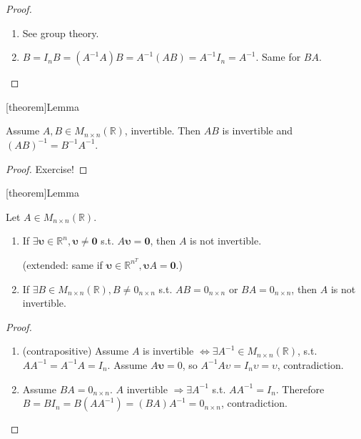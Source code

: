 \documentclass[12pt]{report}
\theoremstyle{definition}
\begin{document}
\begin{proof}
    \,

    \begin{enumerate}[label = (\arabic*)]
        \item See group theory.
        \item $B = I_n B = (A^{-1} A)B = A^{-1} (AB) = A^{-1} I_n = A^{-1}$.
            Same for $BA$.
    \end{enumerate}
    
\end{proof}

[theorem]{Lemma}
\begin{AB = A-1 B-1}
    Assume $A,B \in M_{n \times n}(\mathbb{R})$, invertible.
    Then $AB$ is invertible and ${(AB)}^{-1} = B^{-1}A^{-1}$.
\end{AB = A-1 B-1}

\begin{proof}
    Exercise!
\end{proof} 

[theorem]{Lemma}
\begin{invertibility}
    Let $A \in M_{n \times n}(\mathbb{R})$.
    \begin{enumerate}[label = (\arabic*)]
        \item If $\exists \mathbf{\upsilon} \in \mathbb{R}^{n}, \mathbf{\upsilon} \neq \mathbf{0}$ 
            s.t. $A\mathbf{\upsilon} = \mathbf{0}$, then $A$ is not invertible.

            (extended: same if $\mathbf{\upsilon} \in \mathbb{R}^{n}^{T}, \mathbf{\upsilon}A = \mathbf{0}$.)
        \item If $\exists B \in M_{n \times n}(\mathbb{R}), B \neq 0_{n \times n}$ s.t.
            $AB = 0_{n \times n}$ or $BA = 0_{n \times n}$, then $A$ is not invertible.
    \end{enumerate}
\end{invertibility}

\begin{proof}
    \,

    \begin{enumerate}[label = (\arabic*)]
        \item (contrapositive) Assume $A$ is invertible $\iff \exists A^{-1} \in M_{n\times n}(\mathbb{R})$,
            s.t. $AA^{-1} = A^{-1}A = I_n$.
            Assume $A\mathbf{\upsilon} = 0$, so 
            $A^{-1}A\upsilon = I_n \upsilon = \upsilon$, contradiction.
        \item Assume $BA = 0_{n\times n}$. $A$ invertible $\Rightarrow{}\exists A^{-1}$
            s.t. $AA^{-1} = I_n$.
            Therefore $B = BI_{n} = B(AA^{-1}) = (BA)A^{-1} = 0_{n\times n}$, contradiction.
    \end{enumerate}
\end{proof}
\end{document}
